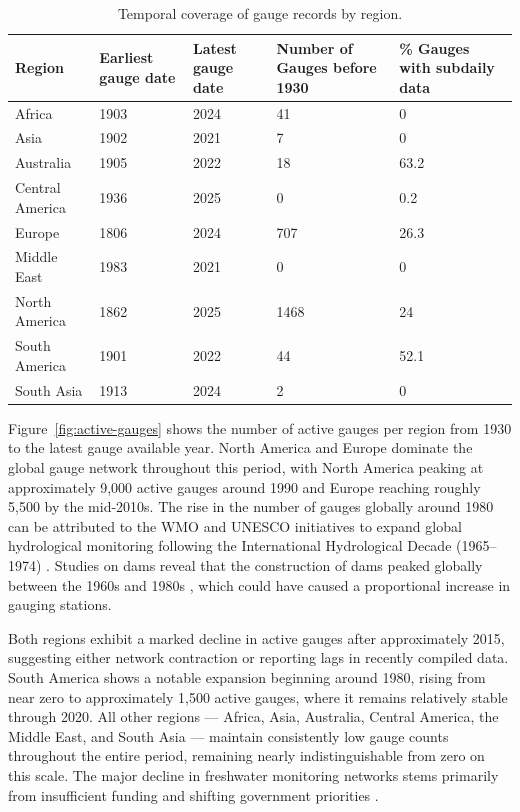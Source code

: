 \begin{table}[!htbp]
\centering
\caption{Temporal coverage of gauge records by region.}
\label{tab:temporal}
\small
\begin{tabular}{@{}lC{0.15\textwidth}C{0.15\textwidth}C{0.15\textwidth}C{0.15\textwidth}@{}}
\toprule
\textbf{Region} & \textbf{Earliest gauge date} & \textbf{Latest gauge date} & \textbf{Number of Gauges before 1930} & \textbf{\% Gauges with subdaily data} \\
\midrule
Africa & 1903 & 2024 & 41 & 0 \\
Asia & 1902 & 2021 & 7 & 0 \\
Australia & 1905 & 2022 & 18 & 63.2 \\
Central America & 1936 & 2025 & 0 & 0.2 \\
Europe & 1806 & 2024 & 707 & 26.3 \\
Middle East & 1983 & 2021 & 0 & 0 \\
North America & 1862 & 2025 & 1468 & 24 \\
South America & 1901 & 2022 & 44 & 52.1 \\
South Asia & 1913 & 2024 & 2 & 0 \\
\bottomrule
\end{tabular}
\end{table}

Figure~\ref{fig:active-gauges} shows the number of active gauges per region from 1930 to the latest gauge available year. North America and Europe dominate the global gauge network throughout this period, with North America peaking at approximately 9,000 active gauges around 1990 and Europe reaching roughly 5,500 by the mid-2010s. The rise in the number of gauges globally around 1980 can be attributed to the WMO and UNESCO initiatives to expand global hydrological monitoring following the International Hydrological Decade (1965--1974) \citep{more1980}. Studies on dams reveal that the construction of dams peaked globally between the 1960s and 1980s \citep{perera2021}, which could have caused a proportional increase in gauging stations.

Both regions exhibit a marked decline in active gauges after approximately 2015, suggesting either network contraction or reporting lags in recently compiled data. South America shows a notable expansion beginning around 1980, rising from near zero to approximately 1,500 active gauges, where it remains relatively stable through 2020. All other regions --- Africa, Asia, Australia, Central America, the Middle East, and South Asia --- maintain consistently low gauge counts throughout the entire period, remaining nearly indistinguishable from zero on this scale. The major decline in freshwater monitoring networks stems primarily from insufficient funding and shifting government priorities \citep{ruhi2018}.

